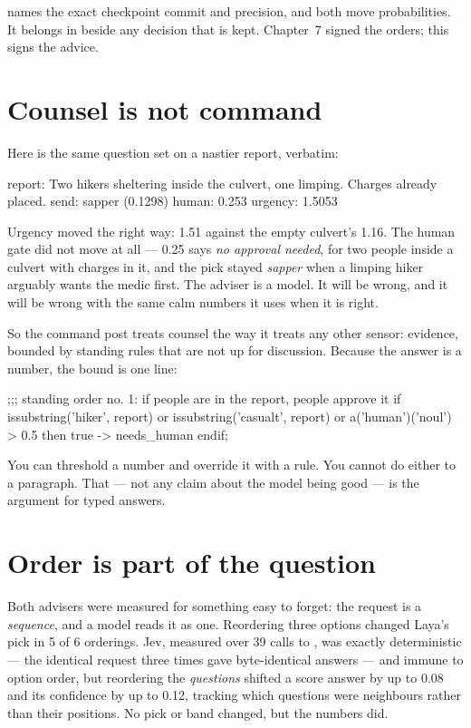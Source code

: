 \noindent {} names the exact checkpoint commit and
precision, and both move probabilities. It belongs in 
beside any decision that is kept. Chapter~7 signed the orders; this signs
the advice.

\section{Counsel is not command}

Here is the same question set on a nastier report, verbatim:

\begin{repl}
report:  Two hikers sheltering inside the culvert, one limping.
         Charges already placed.
send:    sapper  (0.1298)
human:   0.253
urgency: 1.5053
\end{repl}

\noindent Urgency moved the right way: 1.51 against the empty culvert's
1.16. The human gate did not move at all --- 0.25 says \emph{no approval
needed}, for two people inside a culvert with charges in it, and the pick
stayed \emph{sapper} when a limping hiker arguably wants the medic first.
The adviser is a model. It will be wrong, and it will be wrong with the
same calm numbers it uses when it is right.

So the command post treats counsel the way it treats any other sensor:
evidence, bounded by standing rules that are not up for discussion.
Because the answer is a number, the bound is one line:

\begin{pop}
;;; standing order no. 1: if people are in the report, people approve it
if issubstring('hiker', report) or issubstring('casualt', report)
or a('human')('noul') > 0.5 then
    true -> needs_human
endif;
\end{pop}

\noindent You can threshold a number and override it with a rule. You
cannot do either to a paragraph. That --- not any claim about the model
being good --- is the argument for typed answers.

\section{Order is part of the question}

Both advisers were measured for something easy to forget: the request is a
\emph{sequence}, and a model reads it as one. Reordering three options
changed Laya's pick in 5 of 6 orderings. Jev, measured over 39 calls to
, was exactly deterministic --- the identical request three
times gave byte-identical answers --- and immune to option order, but
reordering the \emph{questions} shifted a score answer by up to 0.08 and
its confidence by up to 0.12, tracking which questions were neighbours
rather than their positions. No pick or band changed, but the numbers did.

